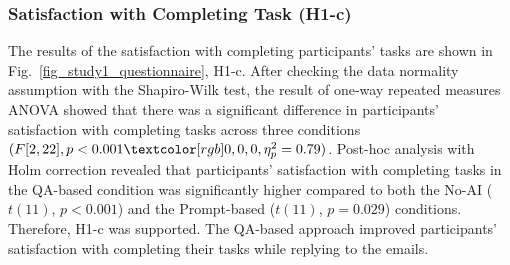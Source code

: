 \subsubsection{Satisfaction with Completing Task (H1-c)}
\label{sec:result1_satisfaction}
The results of the satisfaction with completing participants' tasks are shown in Fig.~\ref{fig_study1_questionnaire}, H1-c.
After checking the data normality assumption with the Shapiro-Wilk test, the result of one-way repeated measures ANOVA showed that there was a significant difference in participants' satisfaction with completing tasks across three conditions $(F[2, 22], p<0.001\red{, \eta_p^2=0.79})$. 
Post-hoc analysis with Holm correction revealed that participants' satisfaction with completing tasks in the QA-based condition was significantly higher compared to both the No-AI ($t(11)$, $p<0.001$) and the Prompt-based ($t(11)$, $p=0.029$) conditions.
Therefore, H1-c was supported.
The QA-based approach improved participants’ satisfaction with completing their tasks while replying to the emails.


